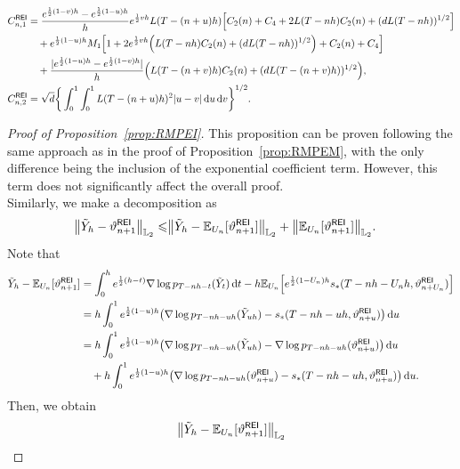 \begin{proposition}
\begin{enumerate}[label=\textbf{(\arabic*)}, leftmargin=2em]
\begin{align*}
            C_{n,1}^{\sf REI}&=\dfrac{e^{\frac{1}{2}(1-v)h}-e^{\frac{1}{2}(1-u)h}}{h}e^{\frac{1}{2}vh}L(T-(n+u)h)\left[C_2(n)+C_4+2L(T-nh)C_2(n)+(dL(T-nh))^{1/2}\right]\\
            &\quad +e^{\frac{1}{2}(1-u)h}M_1\left[1+2e^{\frac{1}{2}vh}\left(L(T-nh)C_2(n)+(dL(T-nh))^{1/2}\right)+C_2(n)+C_4\right]\\
            &\quad +\dfrac{|e^{\frac{1}{2}(1-u)h}-e^{\frac{1}{2}(1-v)h}|}{h}\left(L(T-(n+v)h)C_2(n)+(dL(T-(n+v)h))^{1/2}\right),\\
            C_{n,2}^{\sf REI}&=\sqrt{d}\bigg\{\int_0^1\int_0^1L(T-(n+u)h)^2|u-v|\rmd u\rmd v\bigg\}^{1/2}.
        \end{align*}
    \end{enumerate}
\end{proposition}
\begin{proof}[Proof of Proposition~\ref{prop:RMPEI}]
This proposition can be proven following the same approach as in the proof of Proposition~\ref{prop:RMPEM}, with the only difference being the inclusion of the exponential coefficient term. 
However, this term does not significantly affect the overall proof.\\
Similarly, we make a decomposition as
\begin{align}
    \label{eq:REIdecom}
    \l|\tilde{Y}_h-\vartheta_{n+1}^{\sf REI}\r|_{\Ltwo}\leqslant&\l|\tilde{Y}_h-\mathbb{E}_{U_n}[\vartheta_{n+1}^{\sf REI}]\r|_{\Ltwo}+\l|\mathbb{E}_{U_n}[\vartheta_{n+1}^{\sf REI}]\r|_{\Ltwo}.
\end{align}
Note that
\begin{align*}
    \tilde{Y}_h-\mathbb{E}_{U_n}[\vartheta_{n+1}^{\sf REI}]&=\int_0^he^{\frac{1}{2}(h-t)}\nabla\log p_{T-nh-t}(\tilde{Y}_t)\rmd t-h\mathbb{E}_{U_n}\left[e^{\frac{1}{2}(1-U_n)h}s_*(T-nh-U_nh,\vartheta_{n+U_n}^{\sf REI})\right]\\
    &=h\int_0^1e^{\frac{1}{2}(1-u)h}\left(\nabla\log p_{T-nh-uh}(\tilde{Y}_{uh})-s_*(T-nh-uh,\vartheta_{n+u}^{\sf REI})\right)\rmd u\\
    &=h\int_0^1e^{\frac{1}{2}(1-u)h}\left(\nabla\log p_{T-nh-uh}(\tilde{Y}_{uh})-\nabla\log p_{T-nh-uh}(\vartheta_{n+u}^{\sf REI})\right)\rmd u\\
    &\quad +h\int_0^1e^{\frac{1}{2}(1-u)h}\left(\nabla\log p_{T-nh-uh}(\vartheta_{n+u}^{\sf REI})-s_*(T-nh-uh,\vartheta_{n+u}^{\sf REI})\right)\rmd u.
\end{align*}
Then, we obtain 
\begin{align*}
    &\l|\tilde{Y}_h-\mathbb{E}_{U_n}[\vartheta_{n+1}^{\sf REI}]\r|_{\Ltwo}\\

\end{align*}
\end{proof}
